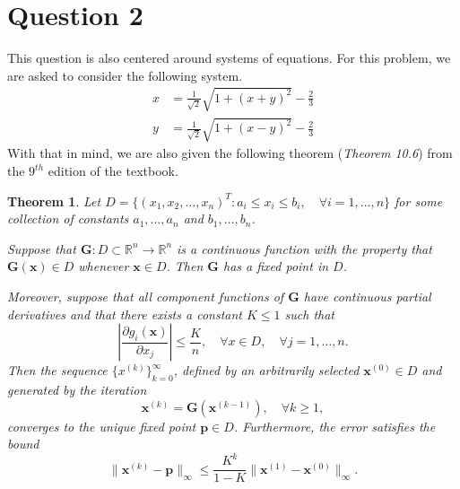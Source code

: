 \documentclass{article}
\newtheorem{theorem}{Theorem}
\begin{document}
\section{Question 2}
This question is also centered around systems of equations. For this problem, we are asked to consider the following system.
\[
\begin{split}
    x &= \frac{1}{\sqrt{2}}\sqrt{1+(x+y)^2}-\frac{2}{3} \\
    y &= \frac{1}{\sqrt{2}}\sqrt{1+(x-y)^2}-\frac{2}{3}
\end{split}
\]
With that in mind, we are also given the following theorem (\textit{Theorem 10.6}) from the \(9^{th}\) edition of the textbook.

\begin{theorem}
    Let $D = \{(x_1, x_2, \dots, x_n)^T : a_i \leq x_i \leq b_i, \quad \forall i = 1, \dots, n\}$ for some collection of constants $a_1, \dots, a_n$ and $b_1, \dots, b_n$. 

    Suppose that $\mathbf{G}: D \subset \mathbb{R}^n \to \mathbb{R}^n$ is a continuous function with the property that $\mathbf{G(x)} \in D$ whenever $\mathbf{x} \in D$. Then $\mathbf{G}$ has a fixed point in $D$.

    Moreover, suppose that all component functions of $\mathbf{G}$ have continuous partial derivatives and that there exists a constant $K \leq 1$ such that 
    \[
    \left| \frac{\partial g_i(\mathbf{x})}{\partial x_j} \right| \leq \frac{K}{n}, \quad \forall x \in D, \quad \forall j = 1, \dots, n.
    \]
    Then the sequence $\{x^{(k)}\}_{k=0}^{\infty}$, defined by an arbitrarily selected $\mathbf{x}^{(0)} \in D$ and generated by the iteration
    \[
    \mathbf{x}^{(k)} = \mathbf{G}(\mathbf{x}^{(k-1)}), \quad \forall k \geq 1,
    \]
converges to the unique fixed point $\mathbf{p} \in D$. Furthermore, the error satisfies the bound
    \[
    \|\mathbf{x}^{(k)} - \mathbf{p}\|_{\infty} \leq \frac{K^k}{1 - K} \|\mathbf{x}^{(1)} - \mathbf{x}^{(0)}\|_{\infty}.
    \]
\end{theorem}
\end{document}
